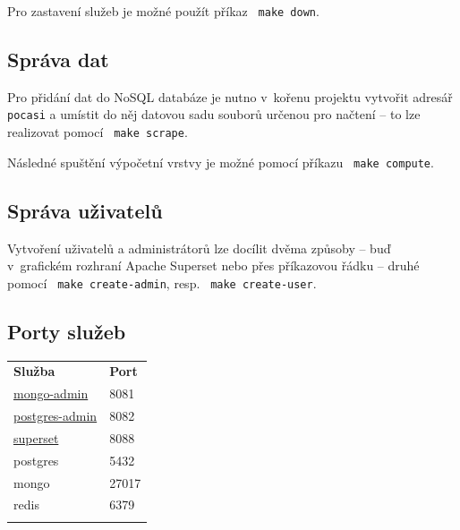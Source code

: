 \documentclass[10pt,a4paper,titlepage]{extarticle}
\begin{document}
    Pro zastavení služeb je možné použít příkaz \texttt{\textdollar\ make down}.

    \subsection{Správa dat}

    Pro přidání dat do NoSQL databáze je nutno v~kořenu projektu vytvořit adresář \texttt{pocasi} a umístit do něj
    datovou sadu souborů určenou pro načtení -- to lze realizovat pomocí \texttt{\textdollar\ make scrape}.

    Následné spuštění výpočetní vrstvy je možné pomocí příkazu \texttt{\textdollar\ make compute}.

    \subsection{Správa uživatelů}

    Vytvoření uživatelů a administrátorů lze docílit dvěma způsoby -- buď v~grafickém rozhraní Apache Superset nebo
    přes příkazovou řádku -- druhé pomocí \texttt{\textdollar\ make create-admin}, resp. \texttt{\textdollar\ make create-user}.

    \subsection{Porty služeb}
    \begin{longtable}[c]{@{}ll@{}}
        \toprule\addlinespace
        \textbf{Služba} & \textbf{Port}
        \\\addlinespace
        \midrule\endhead
        \href{http://localhost:8081}{mongo-admin} & 8081
        \\\addlinespace
        \href{http://localhost:8082}{postgres-admin} & 8082
        \\\addlinespace
        \href{http://localhost:8088}{superset} & 8088
        \\\addlinespace
        postgres & 5432
        \\\addlinespace
        mongo & 27017
        \\\addlinespace
        redis & 6379
        \\\addlinespace
        \bottomrule
    \end{longtable}
\end{document}
